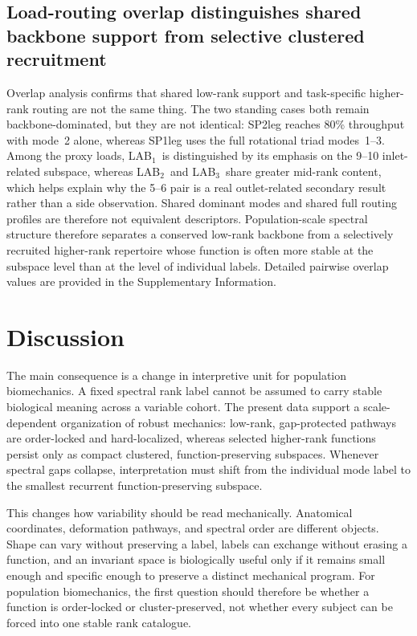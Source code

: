 \documentclass[11pt]{article}
\newcommand{\LABone}{LAB$_1$}
\newcommand{\LABtwo}{LAB$_2$}
\newcommand{\LABthree}{LAB$_3$}
\begin{document}
\subsection{Load-routing overlap distinguishes shared backbone support from selective clustered recruitment}
\label{sec:overlap-results}

Overlap analysis confirms that shared low-rank support and task-specific higher-rank routing are not the same thing.
The two standing cases both remain backbone-dominated, but they are not identical: SP2leg reaches 80\% throughput with mode~2 alone, whereas SP1leg uses the full rotational triad modes~1--3.
Among the proxy loads, \LABone\ is distinguished by its emphasis on the 9--10 inlet-related subspace, whereas \LABtwo\ and \LABthree\ share greater mid-rank content, which helps explain why the 5--6 pair is a real outlet-related secondary result rather than a side observation.
Shared dominant modes and shared full routing profiles are therefore not equivalent descriptors.
Population-scale spectral structure therefore separates a conserved low-rank backbone from a selectively recruited higher-rank repertoire whose function is often more stable at the subspace level than at the level of individual labels.
Detailed pairwise overlap values are provided in the Supplementary Information.

\section{Discussion}
\label{sec:discussion}

The main consequence is a change in interpretive unit for population biomechanics.
A fixed spectral rank label cannot be assumed to carry stable biological meaning across a variable cohort.
The present data support a scale-dependent organization of robust mechanics: low-rank, gap-protected pathways are order-locked and hard-localized, whereas selected higher-rank functions persist only as compact clustered, function-preserving subspaces.
Whenever spectral gaps collapse, interpretation must shift from the individual mode label to the smallest recurrent function-preserving subspace.

This changes how variability should be read mechanically.
Anatomical coordinates, deformation pathways, and spectral order are different objects.
Shape can vary without preserving a label, labels can exchange without erasing a function, and an invariant space is biologically useful only if it remains small enough and specific enough to preserve a distinct mechanical program.
For population biomechanics, the first question should therefore be whether a function is order-locked or cluster-preserved, not whether every subject can be forced into one stable rank catalogue.
\end{document}
